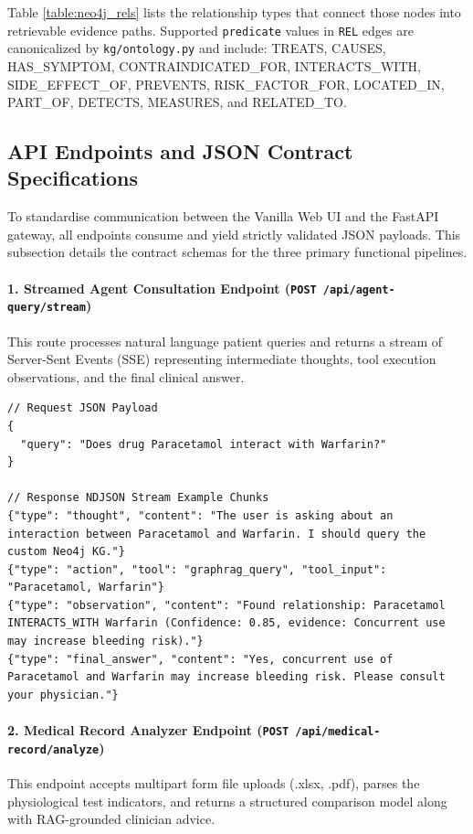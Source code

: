 \documentclass[../main.tex]{subfiles}
\begin{document}
Table \ref{table:neo4j_rels} lists the relationship types that connect those nodes into retrievable evidence paths. Supported \texttt{predicate} values in \texttt{REL} edges are canonicalized by \texttt{kg/ontology.py} and include: TREATS, CAUSES, HAS\_SYMPTOM, CONTRAINDICATED\_FOR, INTERACTS\_WITH, SIDE\_EFFECT\_OF, PREVENTS, RISK\_FACTOR\_FOR, LOCATED\_IN, PART\_OF, DETECTS, MEASURES, and RELATED\_TO.

\subsection{API Endpoints and JSON Contract Specifications}
\label{subsection:4.2.4}

To standardise communication between the Vanilla Web UI and the FastAPI gateway, all endpoints consume and yield strictly validated JSON payloads. This subsection details the contract schemas for the three primary functional pipelines.

\paragraph{1. Streamed Agent Consultation Endpoint (\texttt{POST /api/agent-query/stream})}
This route processes natural language patient queries and returns a stream of Server-Sent Events (SSE) representing intermediate thoughts, tool execution observations, and the final clinical answer.

\begin{lstlisting}[basicstyle=\footnotesize\ttfamily,breaklines=true,columns=fullflexible]
// Request JSON Payload
{
  "query": "Does drug Paracetamol interact with Warfarin?"
}

// Response NDJSON Stream Example Chunks
{"type": "thought", "content": "The user is asking about an interaction between Paracetamol and Warfarin. I should query the custom Neo4j KG."}
{"type": "action", "tool": "graphrag_query", "tool_input": "Paracetamol, Warfarin"}
{"type": "observation", "content": "Found relationship: Paracetamol INTERACTS_WITH Warfarin (Confidence: 0.85, evidence: Concurrent use may increase bleeding risk)."}
{"type": "final_answer", "content": "Yes, concurrent use of Paracetamol and Warfarin may increase bleeding risk. Please consult your physician."}
\end{lstlisting}

\paragraph{2. Medical Record Analyzer Endpoint (\texttt{POST /api/medical-record/analyze})}
This endpoint accepts multipart form file uploads (.xlsx, .pdf), parses the physiological test indicators, and returns a structured comparison model along with RAG-grounded clinician advice.
\end{document}
